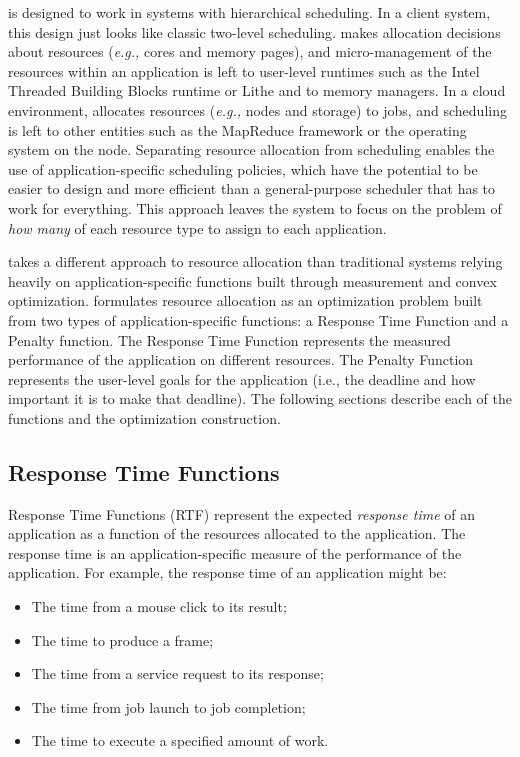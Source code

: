 \pacora is designed to work in systems with hierarchical scheduling.  In a client system, this design just looks like classic two-level scheduling.  \pacora makes allocation decisions about resources (\emph{e.g.,} cores and memory pages), and micro-management of the resources within an application is left to user-level runtimes such as the Intel Threaded Building Blocks runtime\cite{CoMa08} or Lithe\cite{lithe} and to memory managers.  In a cloud environment, \pacora allocates resources (\emph{e.g.,} nodes and storage) to jobs, and scheduling is left to other entities such as the MapReduce framework\cite{mapreduce} or the operating system on the node.  Separating resource allocation from scheduling enables the use of application-specific scheduling policies, which have the potential to be easier to design and more efficient than a general-purpose scheduler that has to work for everything.   This approach leaves the system to focus on the problem of \emph{how many} of each resource type to assign to each application.

\pacora takes a different approach to resource allocation than traditional systems relying heavily on application-specific functions built through measurement and convex optimization. \pacora formulates resource allocation as an optimization problem built from two types of application-specific functions: a Response Time Function and a Penalty function. The Response Time Function represents the measured performance of the application on different resources.  The Penalty Function represents the user-level goals for the application (i.e., the deadline and how important it is to make that deadline). The following sections describe each of the functions and the optimization construction.

\subsection*{Response Time Functions}

Response Time Functions (RTF) represent the expected \emph{response time} of an application as a function of the resources allocated to the application. The response time is an application-specific measure of the performance of the application.
    For example, the response time of an application might be:
    \begin{itemize}\itemsep0pt \parskip0pt 
    \item The time from a mouse click to its result;
    \item The time to produce a frame;
    \item The time from a service request to its response;
    \item The time from job launch to job completion;
    \item The time to execute a specified amount of work.
    \end{itemize}


